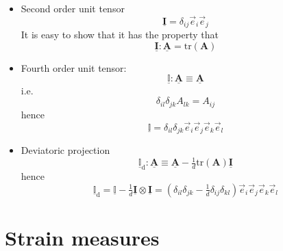 \documentclass[fleqn]{goose-article}
\newcommand\T[1]{\underline{\bm{{#1}}}}
\newcommand\TT[1]{\underline{\mathbb{{#1}}}}
\begin{document}
\begin{itemize}

    \item Second order unit tensor
    \begin{equation}
        \T{I} = \delta_{ij} \vec{e}_i \vec{e}_j
    \end{equation}
    It is easy to show that it has the property that
    \begin{equation}
        \T{I} : \T{A} = \mathrm{tr} ( \bm{A} )
    \end{equation}

    \item Fourth order unit tensor:
    \begin{equation}
        \TT{I} : \T{A} \equiv \T{A}
    \end{equation}
    i.e.
    \begin{equation}
        \delta_{il} \delta_{jk} A_{lk} = A_{ij}
    \end{equation}
    hence
    \begin{equation}
        \TT{I} = \delta_{il} \delta_{jk} \vec{e}_i \vec{e}_j \vec{e}_k \vec{e}_l
    \end{equation}

    \item Deviatoric projection
    \begin{equation}
        \TT{I}_\mathrm{d} : \T{A} \equiv \T{A} - \tfrac{1}{d} \mathrm{tr} ( \bm{A} ) \T{I}
    \end{equation}
    hence
    \begin{equation}
        \TT{I}_\mathrm{d} = \TT{I} - \tfrac{1}{d} \T{I} \otimes \T{I}
        = \left( \delta_{il} \delta_{jk} - \tfrac{1}{d} \delta_{ij} \delta_{kl} \right)
        \vec{e}_i \vec{e}_j \vec{e}_k \vec{e}_l
    \end{equation}

\end{itemize}

\section{Strain measures}
\label{sec:nomenclature::strain}
\end{document}
